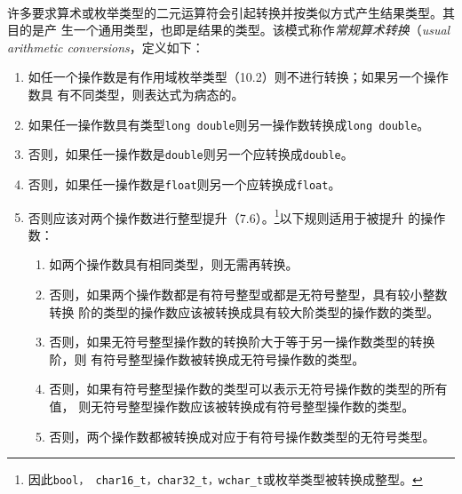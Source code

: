 \paragraph{}
许多要求算术或枚举类型的二元运算符会引起转换并按类似方式产生结果类型。其目的是产
生一个通用类型，也即是结果的类型。该模式称作\textit{常规算术转换}（\textit{usual
arithmetic conversions}，定义如下：
\begin{enumerate}
  \item{如任一个操作数是有作用域枚举类型（10.2）则不进行转换；如果另一个操作数具
    有不同类型，则表达式为病态的。}
  \item{如果任一操作数具有类型\texttt{long double}则另一操作数转换成\texttt{long
    double}。}
  \item{否则，如果任一操作数是\texttt{double}则另一个应转换成\texttt{double}。}
  \item{否则，如果任一操作数是\texttt{float}则另一个应转换成\texttt{float}。}
  \item{否则应该对两个操作数进行整型提升（7.6）。\footnote{因此\texttt{bool，
    char16\_t，char32\_t，wchar\_t}或枚举类型被转换成整型。}以下规则适用于被提升
    的操作数：
    \begin{enumerate}
      \item{如两个操作数具有相同类型，则无需再转换。}
      \item{否则，如果两个操作数都是有符号整型或都是无符号整型，具有较小整数转换
        阶的类型的操作数应该被转换成具有较大阶类型的操作数的类型。}
      \item{否则，如果无符号整型操作数的转换阶大于等于另一操作数类型的转换阶，则
        有符号整型操作数被转换成无符号操作数的类型。}
      \item{否则，如果有符号整型操作数的类型可以表示无符号操作数的类型的所有值，
        则无符号整型操作数应该被转换成有符号整型操作数的类型。}
      \item{否则，两个操作数都被转换成对应于有符号操作数类型的无符号类型。}
    \end{enumerate}
    }
\end{enumerate}

